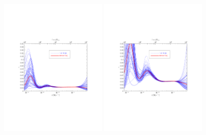 \documentclass[11pt]{article}
\def \halffigwidth{0.45\textwidth}
\begin{document}
\begin{figure}
  \includegraphics[width=\halffigwidth,  trim = 1in 2.9in 1in 2.9in]{nobicep_spline0_p11_r0d2_eps_traj.pdf}%
  \includegraphics[width=\halffigwidth,  trim = 1in 2.9in 1in 2.9in]{nobicep_spline0_p11_r0d5_eps_traj.pdf}

\end{figure}
\end{document}
